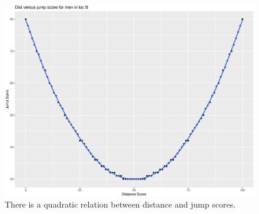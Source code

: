 \documentclass[runningheads]{llncs}
\begin{document}
\begin{figure}
\begin{multicols}{2}
    \includegraphics[width=\linewidth]{distJumpLocBMen.eps} \vspace{0cm} \caption{There is a quadratic relation between distance and jump scores.} \label{distJumpLocBMen} \par
    

\end{multicols}
\end{figure}
\end{document}
